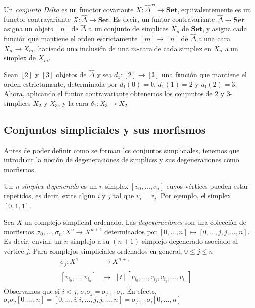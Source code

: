 \documentclass[../main.tex]{subfiles}
\begin{document}
\begin{defi}
    Un \emph{conjunto Delta} es un functor covariante $X\colon \hat{\Delta}^{op} \to \mathbf{Set}$, equivalentemente es un functor contravariante $X\colon \hat{\Delta} \to \mathbf{Set}$.
    Es decir, un funtor contravariante $\hat{\Delta} \to \mathbf{Set}$ asigna un objeto $[n]$ de $\hat{\Delta}$ a un conjunto de simplices $X_n$ de $\mathbf{Set}$, y asigna cada funci\'on que mantiene el orden escrictamente $[m]\to[n]$ de $\hat{\Delta}$ a una cara $X_n \to X_m$, haciendo una inclusi\'on de una $m$-cara de cada simplex en $X_n$ a un simplex de $X_m$.
\end{defi}
\begin{ex}
    Sean $[2]$ y $[3]$ objetos de $\hat{\Delta}$ y sea $d_1\colon [2] \to [3]$ una funci\'on que mantiene el orden estrictamente, determinada por $d_1(0)=0$, $d_1(1)=2$ y $d_1(2)=3$. Ahora, aplicando el funtor contravariante obtenemos los conjuntos de 2 y 3-simplices $X_2$ y $X_3$, y la cara $\delta_1\colon X_3 \to X_2$.
\end{ex}


\subsection{Conjuntos simpliciales y sus morfismos}
Antes de poder definir como se forman los conjuntos simpliciales, tenemos que introducir la noci\'on de degeneraciones de simplices y sus degeneraciones como morfismos.

\begin{defi}
    Un \emph{n-simplex degenerado} es un $n$-simplex $[v_0,\dots,v_n]$ cuyos v\'ertices pueden estar repetidos, es decir, exite alg\'un $i$ y $j$ tal que $v_i=v_j$. Por ejemplo, el simplex $[0,1,1]$.
\end{defi}
\begin{defi}
    Sea $X$ un complejo simplicial ordenado. Las \emph{degeneraciones} son una colecci\'on de morfismos $\sigma_0,\dots,\sigma_n\colon X^n\to X^{n+1}$ determinados por $[0,\dots,n] \mapsto [0,\dots,j,j,\dots,n]$. Es decir, env\'ian un $n$-simplejo a su $(n+1)$-simplejo degenerado asociado al v\'ertice $j$.
    Para complejos simpliciales ordenados en general, $0\le j \le n$
    \begin{align*}
        \sigma_j: X^n           & \longrightarrow X^{n+1} \\
        [v_{i_0},\dots,v_{i_n}] & \longmapsto\!
        \begin{aligned}[t]
            [v_{i_0},\dots,v_{i_j},v_{i_j},\dots,v_{i_n}]
        \end{aligned}
    \end{align*}
    Observamos que si $i<j$, $\sigma_i\sigma_j = \sigma_{j+1}\sigma_{i}$. En efecto, $\sigma_i\sigma_j[0,\dots,n] = [0,\dots,i,i,\dots,j,j,\dots,n] = \sigma_{j+1}\sigma_{i}[0,\dots,n]$
\end{defi}
\end{document}
